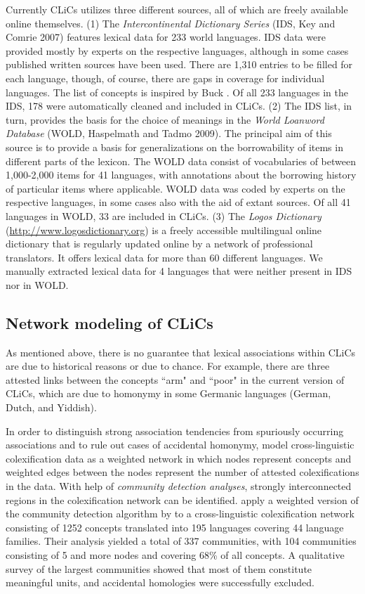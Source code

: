 Currently CLiCs utilizes three different sources, all of which are freely available online
themselves.  (1) The \emph{Intercontinental Dictionary Series} (IDS, Key and Comrie 2007) 
\nocite{Key2007} features lexical
data for 233 world languages. IDS data were provided mostly by experts on the respective languages,
although in some cases published written sources have been used. There are 1,310 entries to be
filled for each language, though, of course, there are gaps in coverage for individual languages.
The list of concepts is inspired by Buck . Of all 233 languages in the IDS, 178 were
automatically cleaned and included in CLiCs.  (2) The IDS list, in turn, provides the basis for the
choice of meanings in the \emph{World Loanword Database} (WOLD, Haspelmath and Tadmo 2009).
\nocite{Wold2009} The principal aim
of this source is to provide a basis for generalizations on the borrowability of items in different
parts of the lexicon. The WOLD data consist of vocabularies of between 1,000-2,000 items for 41
languages, with annotations about the borrowing history of particular items where applicable. WOLD
data was coded by experts on the respective languages, in some cases also with the aid of extant
sources. Of all 41 languages in WOLD, 33 are included in CLiCs.  (3) The \emph{Logos Dictionary}
(\url{http://www.logosdictionary.org}) is a freely accessible multilingual online dictionary that is
regularly updated online by a network of professional translators. It offers lexical data for more
than 60 different languages. We manually extracted lexical data for 4 languages that were neither
present in IDS nor in WOLD. 


\subsection{Network modeling of CLiCs}
As mentioned above, there is no guarantee that lexical associations within CLiCs are due to
historical reasons or due to chance. For example, there are three attested links between the
concepts ``arm" and ``poor" in the current version of CLiCs, which are due to homonymy in some
Germanic languages (German, Dutch, and Yiddish).
 
In order to distinguish strong
association tendencies from
spuriously occurring associations and to rule out cases of accidental homonymy,  model cross-linguistic colexification data as a weighted network
in which nodes represent concepts and weighted edges between the nodes represent the number of
attested colexifications in the data.  With help of \emph{community detection analyses}, strongly
interconnected regions in the colexification network can be identified.  apply
a weighted version of the community detection algorithm by  to a
cross-linguistic colexification network consisting of 1252 concepts translated into 195 languages
covering 44 language families. Their analysis yielded a total of 337 communities, with 104 communities
consisting of 5 and more nodes and covering 68\% of all concepts. A qualitative survey of the
largest communities showed that most of them constitute meaningful units, and accidental homologies
were successfully excluded.
